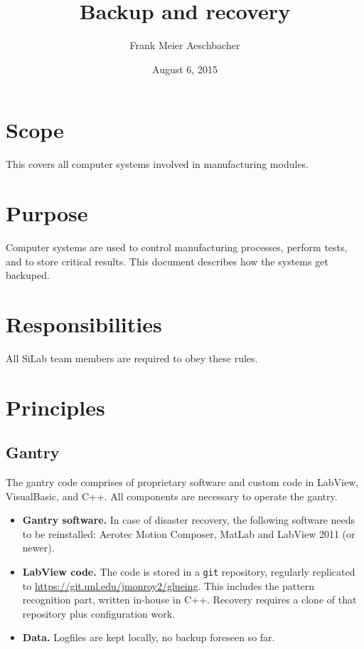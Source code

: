 \documentclass[12pt]{unlsilabsop}
\title{Backup and recovery}
\date{August 6, 2015}
\author{Frank Meier Aeschbacher}
\begin{document}
\maketitle

\section{Scope}
This covers all computer systems involved in manufacturing modules.

\section{Purpose}
Computer systems are used to control manufacturing processes, perform tests, and to store critical results. This document describes how the systems get backuped.


\section{Responsibilities}
All SiLab team members are required to obey these rules.

\section{Principles}

\subsection{Gantry}
The gantry code comprises of proprietary software and custom code in LabView, VisualBasic, and C++. All components are necessary to operate the gantry.
\begin{itemize}
    \item \textbf{Gantry software.} In case of disaster recovery, the following software needs to be reinstalled: Aerotec Motion Composer, MatLab and LabView 2011 (or newer).
    \item \textbf{LabView code.} The code is stored in a \texttt{git} repository, regularly replicated to \url{https://git.unl.edu/jmonroy2/glueing}. This includes the pattern recognition part, written in-house in C++. Recovery requires a clone of that repository plus configuration work.
    \item \textbf{Data.} Logfiles are kept locally, no backup foreseen so far.
\end{itemize}
\end{document}

